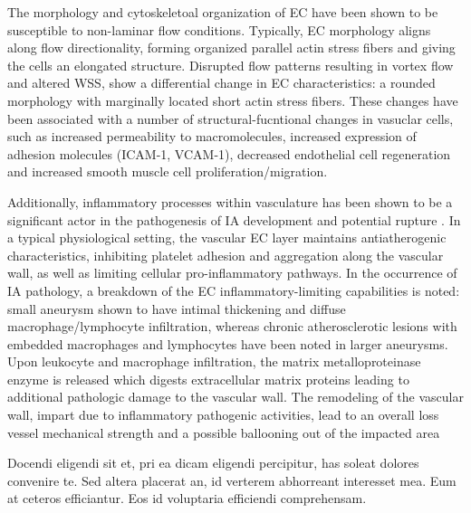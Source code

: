 The morphology and cytoskeletoal organization of EC have been shown to be susceptible to non-laminar flow conditions\cite{wang2013endothelial}. Typically, EC morphology aligns along flow directionality, forming organized parallel actin stress fibers and giving the cells an elongated  
structure\cite{thomas2016biomimetic,gimbrone2016endothelial,balaguru2016disturbed}. Disrupted flow patterns resulting in vortex flow and altered WSS, show a differential change in EC characteristics: a rounded morphology with marginally located short actin stress fibers\cite{chiu2011effects,uzarski2013adaptation,dolan2011high}. These changes have been associated with a number of structural-fucntional changes in vasuclar cells, such as increased permeability to macromolecules, increased expression of adhesion molecules (ICAM-1, VCAM-1), decreased endothelial cell regeneration and increased smooth muscle cell proliferation/migration.


Additionally, inflammatory processes within vasculature has been shown to be a significant actor in the pathogenesis of IA development and potential rupture \cite{chalouhi2012biology,hashimoto2006,signorelli2018}. In a typical physiological setting, the vascular EC layer maintains antiatherogenic characteristics, inhibiting platelet adhesion and aggregation along the vascular wall, as well as limiting cellular pro-inflammatory pathways\cite{ALSOUDI2017951}. In the occurrence of IA pathology, a breakdown of the EC inflammatory-limiting capabilities is noted: small aneurysm shown to have intimal thickening and diffuse macrophage/lymphocyte infiltration, whereas chronic atherosclerotic lesions with embedded macrophages and lymphocytes have been noted in larger aneurysms\cite{Frösen2012,kosierkiewicz1994}. Upon leukocyte and macrophage infiltration, the matrix metalloproteinase enzyme is released which digests extracellular matrix proteins leading to additional pathologic damage to the vascular wall\cite{tronic2000,aoki2007a}. The remodeling of the vascular wall, impart due to inflammatory pathogenic activities, lead to an overall loss vessel mechanical strength and a possible ballooning out of the impacted area   



Docendi eligendi sit et, pri ea dicam eligendi percipitur, has soleat 
dolores convenire te. Sed altera placerat an, id verterem abhorreant 
interesset mea. Eum at ceteros efficiantur. Eos id voluptaria efficiendi 
comprehensam. \cite{HPL_DGEMM_01,HPL_DGEMM_02}

